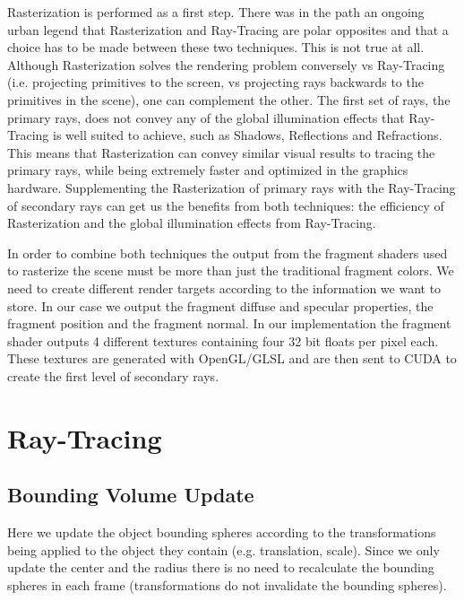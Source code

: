 Rasterization is performed as a first step. There was in the path an ongoing urban legend that Rasterization and Ray-Tracing are polar opposites and that a choice has to be made between these two techniques. This is not true at all. Although Rasterization solves the rendering problem conversely vs Ray-Tracing (i.e. projecting primitives to the screen, vs projecting rays backwards to the primitives in the scene), one can complement the other. The first set of rays, the primary rays, does not convey any of the global illumination effects that Ray-Tracing is well suited to achieve, such as Shadows, Reflections and Refractions. This means that Rasterization can convey similar visual results to tracing the primary rays, while being extremely faster and optimized in the graphics hardware. Supplementing the Rasterization of primary rays with the Ray-Tracing of secondary rays can get us the benefits from both techniques: the efficiency of Rasterization and the global illumination effects from Ray-Tracing.

\medskip

In order to combine both techniques the output from the fragment shaders used to rasterize the scene must be more than just the traditional fragment colors. We need to create different render targets according to the information we want to store. In our case we output the fragment diffuse and specular properties, the fragment position and the fragment normal. In our implementation the fragment shader outputs 4 different textures containing four 32 bit floats per pixel each. These textures are generated with OpenGL/GLSL and are then sent to CUDA to create the first level of secondary rays.

\section{Ray-Tracing}
\label{section:algorithm-ray-tracing}

\subsection{Bounding Volume Update}
Here we update the object bounding spheres according to the transformations being applied to the object they contain (e.g. translation, scale). Since we only update the center and the radius there is no need to recalculate the bounding spheres in each frame (transformations do not invalidate the bounding spheres).

